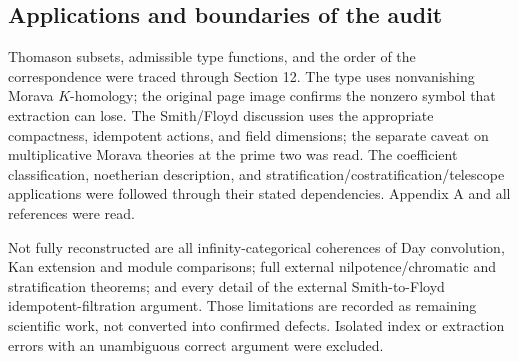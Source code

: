 \documentclass[10pt]{article}
\begin{document}
\subsection*{Applications and boundaries of the audit}
Thomason subsets, admissible type functions, and the order of the correspondence were traced through Section 12. The type uses nonvanishing Morava \(K\)-homology; the original page image confirms the nonzero symbol that extraction can lose. The Smith/Floyd discussion uses the appropriate compactness, idempotent actions, and field dimensions; the separate caveat on multiplicative Morava theories at the prime two was read. The coefficient classification, noetherian description, and stratification/costratification/telescope applications were followed through their stated dependencies. Appendix A and all references were read.\par
Not fully reconstructed are all infinity-categorical coherences of Day convolution, Kan extension and module comparisons; full external nilpotence/chromatic and stratification theorems; and every detail of the external Smith-to-Floyd idempotent-filtration argument. Those limitations are recorded as remaining scientific work, not converted into confirmed defects. Isolated index or extraction errors with an unambiguous correct argument were excluded.\par
\end{document}
